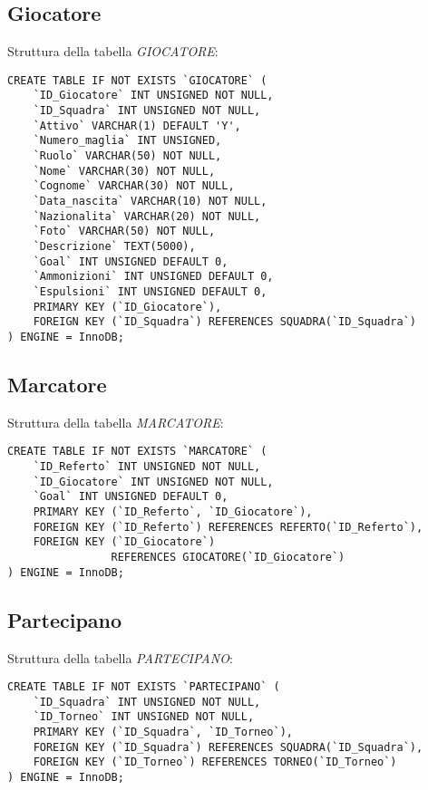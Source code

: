 \newpage

\subsection{Giocatore}
Struttura della tabella \emph{GIOCATORE}:

\begin{lstlisting}
CREATE TABLE IF NOT EXISTS `GIOCATORE` (
	`ID_Giocatore` INT UNSIGNED NOT NULL,
	`ID_Squadra` INT UNSIGNED NOT NULL,
	`Attivo` VARCHAR(1) DEFAULT 'Y',
	`Numero_maglia` INT UNSIGNED,
	`Ruolo` VARCHAR(50) NOT NULL,
	`Nome` VARCHAR(30) NOT NULL,
	`Cognome` VARCHAR(30) NOT NULL,
	`Data_nascita` VARCHAR(10) NOT NULL,
	`Nazionalita` VARCHAR(20) NOT NULL,
	`Foto` VARCHAR(50) NOT NULL,
	`Descrizione` TEXT(5000),
	`Goal` INT UNSIGNED DEFAULT 0,
	`Ammonizioni` INT UNSIGNED DEFAULT 0,
	`Espulsioni` INT UNSIGNED DEFAULT 0,
	PRIMARY KEY (`ID_Giocatore`),
	FOREIGN KEY (`ID_Squadra`) REFERENCES SQUADRA(`ID_Squadra`)
) ENGINE = InnoDB;
\end{lstlisting}

\subsection{Marcatore}
Struttura della tabella \emph{MARCATORE}:

\begin{lstlisting}
CREATE TABLE IF NOT EXISTS `MARCATORE` (
	`ID_Referto` INT UNSIGNED NOT NULL,
	`ID_Giocatore` INT UNSIGNED NOT NULL,
	`Goal` INT UNSIGNED DEFAULT 0,
	PRIMARY KEY (`ID_Referto`, `ID_Giocatore`),
	FOREIGN KEY (`ID_Referto`) REFERENCES REFERTO(`ID_Referto`),
	FOREIGN KEY (`ID_Giocatore`)
	            REFERENCES GIOCATORE(`ID_Giocatore`)
) ENGINE = InnoDB;
\end{lstlisting}

\subsection{Partecipano}
Struttura della tabella \emph{PARTECIPANO}:

\begin{lstlisting}
CREATE TABLE IF NOT EXISTS `PARTECIPANO` (
	`ID_Squadra` INT UNSIGNED NOT NULL,
	`ID_Torneo` INT UNSIGNED NOT NULL,
	PRIMARY KEY (`ID_Squadra`, `ID_Torneo`),
	FOREIGN KEY (`ID_Squadra`) REFERENCES SQUADRA(`ID_Squadra`),
	FOREIGN KEY (`ID_Torneo`) REFERENCES TORNEO(`ID_Torneo`)
) ENGINE = InnoDB;
\end{lstlisting}


